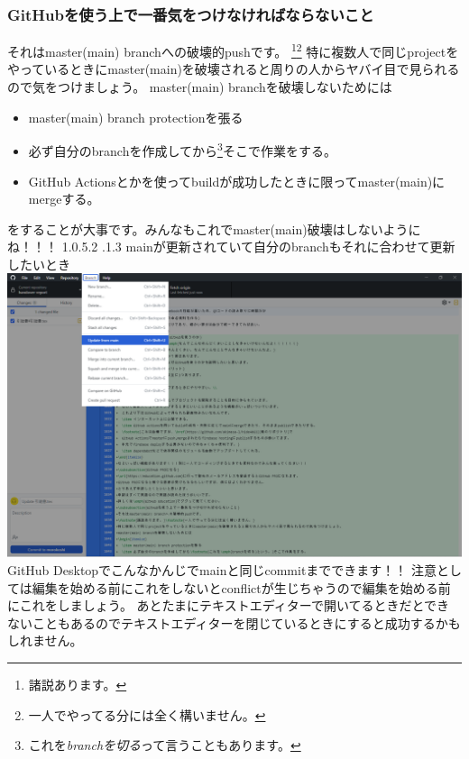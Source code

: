 \documentclass[dvipdfmx,jb5]{jarticle}
\makeatletter
\newcommand{\subsubsubsection}{\@startsection{paragraph}{4}{\z@}%
    {1.0\Cvs \@plus.5\Cdp \@minus.2\Cdp}%
    {.1\Cvs \@plus.3\Cdp}%
    {\large \bfseries}
  }
\makeatother
\begin{document}
\subsubsection{GitHubを使う上で一番気をつけなければならないこと}
それはmaster(main) branchへの破壊的pushです。
\footnote{諸説あります。}\footnote{一人でやってる分には全く構いません。}
特に複数人で同じprojectをやっているときにmaster(main)を破壊されると周りの人からヤバイ目で見られるので気をつけましょう。
master(main) branchを破壊しないためには
\begin{itemize}
  \item master(main) branch protectionを張る
  \item 必ず自分のbranchを作成してから\footnote{これを\emph{branchを切る}って言うこともあります。}そこで作業をする。
  \item GitHub Actionsとかを使ってbuildが成功したときに限ってmaster(main)にmergeする。
\end{itemize}
をすることが大事です。みんなもこれでmaster(main)破壊はしないようにね！！！
\subsubsubsection{mainが更新されていて自分のbranchもそれに合わせて更新したいとき}
\includegraphics[width=15cm]{assets/update-branch.png}\\
GitHub Desktopでこんなかんじでmainと同じcommitまでできます！！
注意としては編集を始める前にこれをしないとconflictが生じちゃうので編集を始める前にこれをしましょう。
あとたまにテキストエディターで開いてるときだとできないこともあるのでテキストエディターを閉じているときにすると成功するかもしれません。
\end{document}
